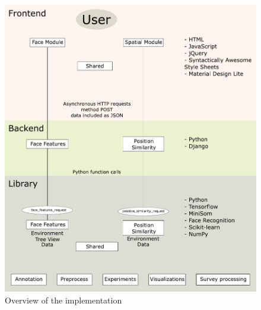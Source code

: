 \begin{figure}
    \centering
    \includegraphics[width=0.95\linewidth]{graphs/implementation_overview.pdf}
    \caption{Overview of the implementation}
    \label{fig:implementation_overview}
\end{figure}